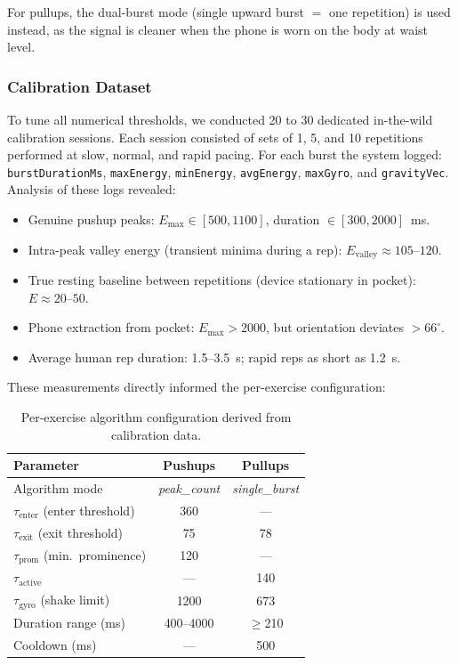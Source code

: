 \documentclass[11pt]{article}
\begin{document}
For pullups, the dual-burst mode (single upward burst $=$ one repetition) is used instead, as the signal is cleaner when the phone is worn on the body at waist level.

\subsubsection{Calibration Dataset}
\label{sec:dataset}

To tune all numerical thresholds, we conducted 20 to 30 dedicated in-the-wild calibration sessions. Each session consisted of sets of 1, 5, and 10 repetitions performed at slow, normal, and rapid pacing. For each burst the system logged: \texttt{burstDurationMs}, \texttt{maxEnergy}, \texttt{minEnergy}, \texttt{avgEnergy}, \texttt{maxGyro}, and \texttt{gravityVec}. Analysis of these logs revealed:
\begin{itemize}
  \item Genuine pushup peaks: $E_{\max} \in [500, 1100]$, duration $\in [300, 2000]$~ms.
  \item Intra-peak valley energy (transient minima during a rep): $E_{\text{valley}} \approx 105$--$120$.
  \item True resting baseline between repetitions (device stationary in pocket): $E \approx 20$--$50$.
  \item Phone extraction from pocket: $E_{\max} > 2000$, but orientation deviates $> 66^{\circ}$.
  \item Average human rep duration: 1.5--3.5~s; rapid reps as short as 1.2~s.
\end{itemize}
These measurements directly informed the per-exercise configuration:

\begin{table}[H]
\centering
\small
\begin{tabular}{lcc}
\toprule
\textbf{Parameter} & \textbf{Pushups} & \textbf{Pullups} \\
\midrule
Algorithm mode & \textit{peak\_count} & \textit{single\_burst} \\
$\tau_{\text{enter}}$ (enter threshold) & 360 & — \\
$\tau_{\text{exit}}$ (exit threshold) & 75 & 78 \\
$\tau_{\text{prom}}$ (min.\ prominence) & 120 & — \\
$\tau_{\text{active}}$ & — & 140 \\
$\tau_{\text{gyro}}$ (shake limit) & 1200 & 673 \\
Duration range (ms) & 400--4000 & $\geq$210 \\
Cooldown (ms) & — & 500 \\
\bottomrule
\end{tabular}
\caption{Per-exercise algorithm configuration derived from calibration data.}
\label{tab:config}
\end{table}
\end{document}
